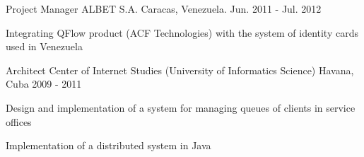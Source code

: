 \begin{cventries}
\begin{tabular}{|p{4.5cm} | p{2cm} | p{4cm} | p{2cm} | p{2cm}|}
  \end{tabular}

\cventry
{Project Manager} %
{ALBET S.A.} %
{Caracas, Venezuela.} %
{Jun. 2011 - Jul. 2012} %
{ %
\begin{cvitems}
\item {Integrating QFlow product (ACF Technologies) with the system of identity cards used in Venezuela}
\end{cvitems}
}


\cventry
{Architect} %
{Center of Internet Studies (University of Informatics Science)} %
{Havana, Cuba} %
{2009 - 2011} %
{ %
\begin{cvitems}
\item {Design and implementation of a system for managing queues of clients in service offices}
\item {Implementation of a distributed system in Java}
\end{cvitems}
}


\end{cventries}
